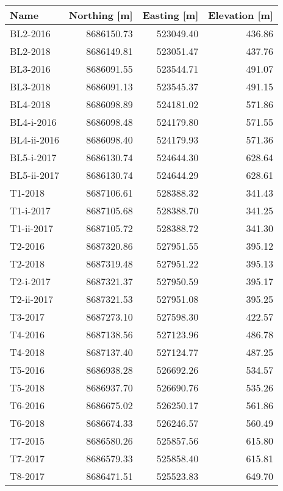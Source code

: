 \begin{tabular}{lrrr}
\toprule
        Name &  Northing [m] &  Easting [m] &  Elevation [m] \\
\midrule
    BL2-2016 &    8686150.73 &    523049.40 &         436.86 \\
    BL2-2018 &    8686149.81 &    523051.47 &         437.76 \\
    BL3-2016 &    8686091.55 &    523544.71 &         491.07 \\
    BL3-2018 &    8686091.13 &    523545.37 &         491.15 \\
    BL4-2018 &    8686098.89 &    524181.02 &         571.86 \\
  BL4-i-2016 &    8686098.48 &    524179.80 &         571.55 \\
 BL4-ii-2016 &    8686098.40 &    524179.93 &         571.36 \\
  BL5-i-2017 &    8686130.74 &    524644.30 &         628.64 \\
 BL5-ii-2017 &    8686130.74 &    524644.29 &         628.61 \\
     T1-2018 &    8687106.61 &    528388.32 &         341.43 \\
   T1-i-2017 &    8687105.68 &    528388.70 &         341.25 \\
  T1-ii-2017 &    8687105.72 &    528388.72 &         341.30 \\
     T2-2016 &    8687320.86 &    527951.55 &         395.12 \\
     T2-2018 &    8687319.48 &    527951.22 &         395.13 \\
   T2-i-2017 &    8687321.37 &    527950.59 &         395.17 \\
  T2-ii-2017 &    8687321.53 &    527951.08 &         395.25 \\
     T3-2017 &    8687273.10 &    527598.30 &         422.57 \\
     T4-2016 &    8687138.56 &    527123.96 &         486.78 \\
     T4-2018 &    8687137.40 &    527124.77 &         487.25 \\
     T5-2016 &    8686938.28 &    526692.26 &         534.57 \\
     T5-2018 &    8686937.70 &    526690.76 &         535.26 \\
     T6-2016 &    8686675.02 &    526250.17 &         561.86 \\
     T6-2018 &    8686674.33 &    526246.57 &         560.49 \\
     T7-2015 &    8686580.26 &    525857.56 &         615.80 \\
     T7-2017 &    8686579.33 &    525858.40 &         615.81 \\
     T8-2017 &    8686471.51 &    525523.83 &         649.70 \\
\bottomrule
\end{tabular}
